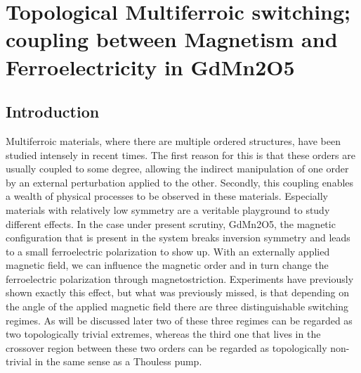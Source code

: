 \chapter{Topological Multiferroic switching; coupling between Magnetism and Ferroelectricity in GdMn2O5}
\section{Introduction}
Multiferroic materials, where there are multiple ordered structures, have been studied intensely in recent times. The first reason for this is that these orders are usually coupled to some degree, allowing the indirect manipulation of one order by an external perturbation applied to the other. Secondly, this coupling enables a wealth of physical processes to be observed in these materials. Especially materials with relatively low symmetry are a veritable playground to study different effects. In the case under present scrutiny, GdMn2O5, the magnetic configuration that is present in the system breaks inversion symmetry and leads to a small ferroelectric polarization to show up. With an externally applied magnetic field, we can influence the magnetic order and in turn change the ferroelectric polarization through magnetostriction. Experiments have previously shown exactly this effect, but what was previously missed, is that depending on the angle of the applied magnetic field there are three distinguishable switching regimes. As will be discussed later two of these three regimes can be regarded as two topologically trivial extremes, whereas the third one that lives in the crossover region between these two orders can be regarded as topologically non-trivial in the same sense as a Thouless pump.

